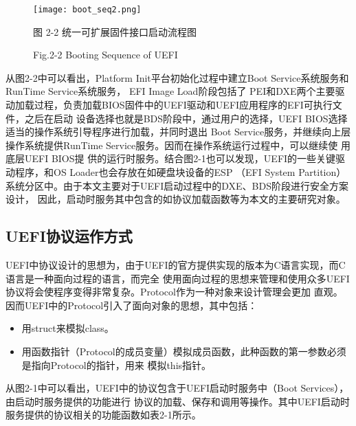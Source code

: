 \begin{figure}[htb]
    \vspace{0cm}   
    \setlength{\abovecaptionskip}{0.3cm}  
	\centering
    \texttt{[image: boot\_seq2.png]}
    \caption*{图 2-2 统一可扩展固件接口启动流程图}
    \setlength{\belowcaptionskip}{-0.7cm}
    \caption*{Fig.2-2 Booting Sequence of UEFI}
\end{figure}

从图2-2中可以看出，Platform Init平台初始化过程中建立Boot Service系统服务和RunTime Service系统服务，
EFI Image Load阶段包括了
PEI和DXE两个主要驱动加载过程，负责加载BIOS固件中的UEFI驱动和UEFI应用程序的EFI可执行文件，之后在启动
设备选择也就是BDS阶段中，通过用户的选择，UEFI BIOS选择适当的操作系统引导程序进行加载，并同时退出
Boot Service服务，并继续向上层操作系统提供RunTime Service服务。因而在操作系统运行过程中，可以继续使
用底层UEFI BIOS提
供的运行时服务。结合图2-1也可以发现，UEFI的一些关键驱动程序，和OS Loader也会存放在如硬盘块设备的ESP
（EFI System Partition）系统分区中。由于本文主要对于UEFI启动过程中的DXE、BDS阶段进行安全方案设计，
因此，启动时服务其中包含的如协议加载函数等为本文的主要研究对象。

\subsection{UEFI协议运作方式}
UEFI中协议设计的思想为，由于UEFI的官方提供实现的版本为C语言实现，而C语言是一种面向过程的语言，而完全
使用面向过程的思想来管理和使用众多UEFI协议将会使程序变得非常复杂。Protocol作为一种对象来设计管理会更加
直观\cite{english13,english12}。因而UEFI中的Protocol引入了面向对象的思想，其中包括：
\begin{itemize}
\item 用struct来模拟class。
\item 用函数指针（Protocol的成员变量）模拟成员函数，此种函数的第一参数必须是指向Protocol的指针，用来
模拟this指针。
\end{itemize}
\par 从图2-1中可以看出，UEFI中的协议包含于UEFI启动时服务中（Boot Services），由启动时服务提供的功能进行
协议的加载、保存和调用等操作。其中UEFI启动时服务提供的协议相关的功能函数如表2-1所示。

